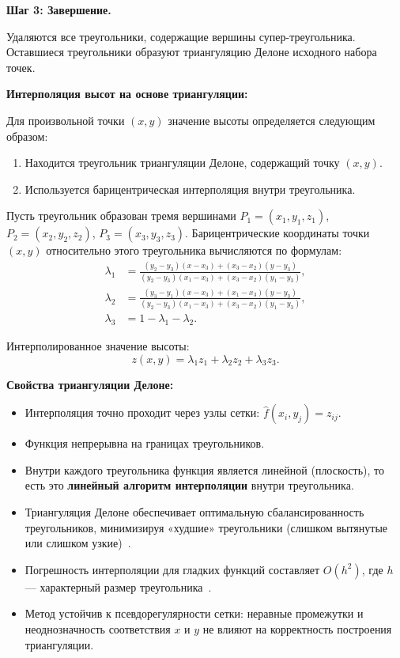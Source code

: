 \documentclass[a4paper, 14pt]{extarticle}
\begin{document}
\textbf{Шаг 3: Завершение.}

Удаляются все треугольники, содержащие вершины супер-треугольника. Оставшиеся треугольники образуют триангуляцию Делоне исходного набора точек.

\textbf{Интерполяция высот на основе триангуляции:}

Для произвольной точки $(x, y)$ значение высоты определяется следующим образом:
\begin{enumerate}
  \item Находится треугольник триангуляции Делоне, содержащий точку $(x, y)$.
  \item Используется барицентрическая интерполяция внутри треугольника.
\end{enumerate}

Пусть треугольник образован тремя вершинами $P_1 = (x_1, y_1, z_1)$, $P_2 = (x_2, y_2, z_2)$, $P_3 = (x_3, y_3, z_3)$. Барицентрические координаты точки $(x, y)$ относительно этого треугольника вычисляются по формулам:
\[
\begin{aligned}
\lambda_1 &= \frac{(y_2 - y_3)(x - x_3) + (x_3 - x_2)(y - y_3)}{(y_2 - y_3)(x_1 - x_3) + (x_3 - x_2)(y_1 - y_3)},\\
\lambda_2 &= \frac{(y_3 - y_1)(x - x_3) + (x_1 - x_3)(y - y_3)}{(y_2 - y_3)(x_1 - x_3) + (x_3 - x_2)(y_1 - y_3)},\\
\lambda_3 &= 1 - \lambda_1 - \lambda_2.
\end{aligned}
\]

Интерполированное значение высоты:
\[
z(x, y) = \lambda_1 z_1 + \lambda_2 z_2 + \lambda_3 z_3.
\]

\textbf{Свойства триангуляции Делоне:}
\begin{itemize}
  \item Интерполяция точно проходит через узлы сетки: $\hat{f}(x_i, y_j) = z_{ij}$.
  \item Функция непрерывна на границах треугольников.
  \item Внутри каждого треугольника функция является линейной (плоскость), то есть это \textbf{линейный алгоритм интерполяции} внутри треугольника.
  \item Триангуляция Делоне обеспечивает оптимальную сбалансированность треугольников, минимизируя «худшие» треугольники (слишком вытянутые или слишком узкие)~\cite{deberg2004}.
  \item Погрешность интерполяции для гладких функций составляет $O(h^2)$, где $h$ --- характерный размер треугольника~\cite{skvortsov2002}.
  \item Метод устойчив к псевдорегулярности сетки: неравные промежутки и неоднозначность соответствия $x$ и $y$ не влияют на корректность построения триангуляции.
\end{itemize}
\end{document}

